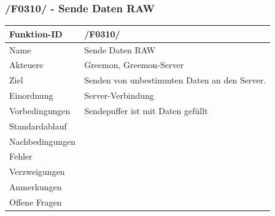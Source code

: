 \documentclass[pointlessnumbers]{scrartcl}
\begin{document}
 \subsubsection{/F0310/ - Sende Daten RAW}
 \begin{tabular}{|p{\BreiteErsterTab}|p{\BreiteZweiterTab}|}\hline
    Funktion-ID &       /F0310/  
                        \\ \hline
    Name &              Sende Daten RAW
                        \\ \hline
    Akteuere &          Greemon, Greemon-Server
                        \\ \hline
    Ziel &              Senden von unbestimmten Daten an den Server. 
                        \\ \hline
    Einordnung &        Server-Verbindung
                        \\ \hline
    Vorbedingungen &    Sendepuffer ist mit Daten gefüllt
                        \\ \hline
    Standardablauf &    
                        \\ \hline
    Nachbedingungen &   
                        \\ \hline
    Fehler &       
                        \\ \hline
    Verzweigungen &     
                        \\ \hline
    Anmerkungen &       
                        \\ \hline
    Offene Fragen &     
                        \\ \hline
 \end{tabular} 
 
\end{document}
